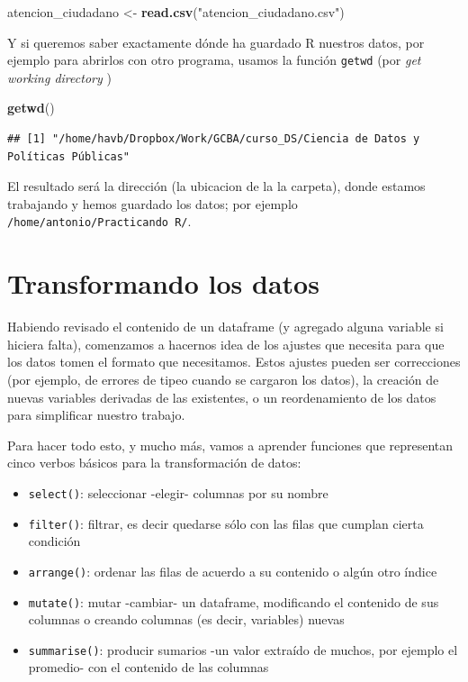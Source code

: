 \documentclass[]{book}
\newenvironment{Shaded}{\begin{snugshade}}{\end{snugshade}}
\newcommand{\KeywordTok}[1]{\textcolor[rgb]{0.13,0.29,0.53}{\textbf{#1}}}
\newcommand{\StringTok}[1]{\textcolor[rgb]{0.31,0.60,0.02}{#1}}
\newcommand{\NormalTok}[1]{#1}
\providecommand{\tightlist}{%
  \setlength{\itemsep}{0pt}\setlength{\parskip}{0pt}}
\begin{document}
\begin{Shaded}
\begin{Highlighting}[]
\NormalTok{atencion_ciudadano <-}\StringTok{ }\KeywordTok{read.csv}\NormalTok{(}\StringTok{"atencion_ciudadano.csv"}\NormalTok{)}
\end{Highlighting}
\end{Shaded}

Y si queremos saber exactamente dónde ha guardado R nuestros datos, por
ejemplo para abrirlos con otro programa, usamos la función
\texttt{getwd} (por \emph{get working directory} )

\begin{Shaded}
\begin{Highlighting}[]
\KeywordTok{getwd}\NormalTok{()}
\end{Highlighting}
\end{Shaded}

\begin{verbatim}
## [1] "/home/havb/Dropbox/Work/GCBA/curso_DS/Ciencia de Datos y Políticas Públicas"
\end{verbatim}

El resultado será la dirección (la ubicacion de la la carpeta), donde
estamos trabajando y hemos guardado los datos; por ejemplo
\texttt{/home/antonio/Practicando\ R/}.

\section{Transformando los datos}\label{transformando-los-datos}

Habiendo revisado el contenido de un dataframe (y agregado alguna
variable si hiciera falta), comenzamos a hacernos idea de los ajustes
que necesita para que los datos tomen el formato que necesitamos. Estos
ajustes pueden ser correcciones (por ejemplo, de errores de tipeo cuando
se cargaron los datos), la creación de nuevas variables derivadas de las
existentes, o un reordenamiento de los datos para simplificar nuestro
trabajo.

Para hacer todo esto, y mucho más, vamos a aprender funciones que
representan cinco verbos básicos para la transformación de datos:

\begin{itemize}
\tightlist
\item
  \texttt{select()}: seleccionar -elegir- columnas por su nombre
\item
  \texttt{filter()}: filtrar, es decir quedarse sólo con las filas que
  cumplan cierta condición
\item
  \texttt{arrange()}: ordenar las filas de acuerdo a su contenido o
  algún otro índice
\item
  \texttt{mutate()}: mutar -cambiar- un dataframe, modificando el
  contenido de sus columnas o creando columnas (es decir, variables)
  nuevas
\item
  \texttt{summarise()}: producir sumarios -un valor extraído de muchos,
  por ejemplo el promedio- con el contenido de las columnas
\end{itemize}
\end{document}
